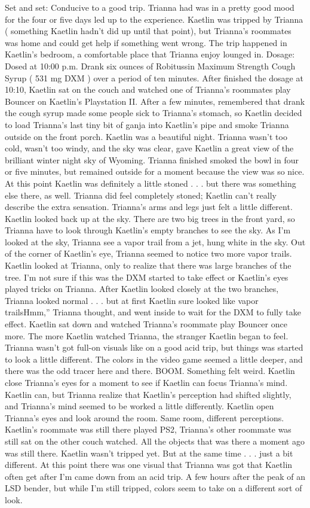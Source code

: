 \documentclass[12pt]{book}
\begin{document}
Set and set: Conducive to a good trip. Trianna had was in a pretty good mood for the four or five days led up to the experience. Kaetlin was tripped by Trianna ( something Kaetlin hadn't did up until that point), but Trianna's roommates was home and could get help if something went wrong. The trip happened in Kaetlin's bedroom, a comfortable place that Trianna enjoy lounged in. Dosage: Dosed at 10:00 p.m. Drank six ounces of Robitussin Maximum Strength Cough Syrup ( 531 mg DXM ) over a period of ten minutes. After finished the dosage at 10:10, Kaetlin sat on the couch and watched one of Trianna's roommates play Bouncer on Kaetlin's Playstation II. After a few minutes, remembered that drank the cough syrup made some people sick to Trianna's stomach, so Kaetlin decided to load Trianna's last tiny bit of ganja into Kaetlin's pipe and smoke Trianna outside on the front porch. Kaetlin was a beautiful night. Trianna wasn't too cold, wasn't too windy, and the sky was clear, gave Kaetlin a great view of the brilliant winter night sky of Wyoming. Trianna finished smoked the bowl in four or five minutes, but remained outside for a moment because the view was so nice. At this point Kaetlin was definitely a little stoned . . .  but there was something else there, as well. Trianna did feel completely stoned; Kaetlin can't really describe the extra sensation. Trianna's arms and legs just felt a little different. Kaetlin looked back up at the sky. There are two big trees in the front yard, so Trianna have to look through Kaetlin's empty branches to see the sky. As I'm looked at the sky, Trianna see a vapor trail from a jet, hung white in the sky. Out of the corner of Kaetlin's eye, Trianna seemed to notice two more vapor trails. Kaetlin looked at Trianna, only to realize that there was large branches of the tree. I'm not sure if this was the DXM started to take effect or Kaetlin's eyes played tricks on Trianna. After Kaetlin looked closely at the two branches, Trianna looked normal . . .  but at first Kaetlin sure looked like vapor trailsHmm,'' Trianna thought, and went inside to wait for the DXM to fully take effect. Kaetlin sat down and watched Trianna's roommate play Bouncer once more. The more Kaetlin watched Trianna, the stranger Kaetlin began to feel. Trianna wasn't got full-on visuals like on a good acid trip, but things was started to look a little different. The colors in the video game seemed a little deeper, and there was the odd tracer here and there. BOOM. Something felt weird. Kaetlin close Trianna's eyes for a moment to see if Kaetlin can focus Trianna's mind. Kaetlin can, but Trianna realize that Kaetlin's perception had shifted slightly, and Trianna's mind seemed to be worked a little differently. Kaetlin open Trianna's eyes and look around the room. Same room, different perceptions. Kaetlin's roommate was still there played PS2, Trianna's other roommate was still sat on the other couch watched. All the objects that was there a moment ago was still there. Kaetlin wasn't tripped yet. But at the same time . . .  just a bit different. At this point there was one visual that Trianna was got that Kaetlin often get after I'm came down from an acid trip. A few hours after the peak of an LSD bender, but while I'm still tripped, colors seem to take on a different sort of look. 
\end{document}
